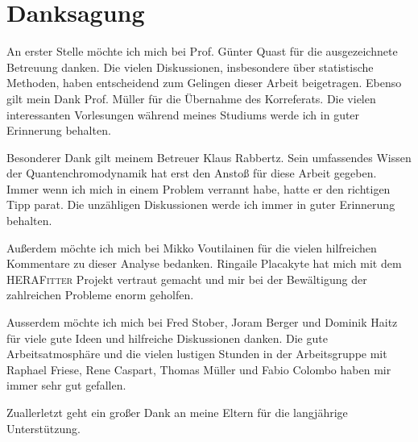 \chapter*{Danksagung}

An erster Stelle möchte ich mich bei Prof. Günter Quast für die ausgezeichnete
Betreuung danken. Die vielen Diskussionen, insbesondere über statistische
Methoden, haben entscheidend zum Gelingen dieser Arbeit beigetragen. Ebenso gilt
mein Dank Prof. Müller für die Übernahme des Korreferats. Die vielen
interessanten Vorlesungen während meines Studiums werde ich in guter Erinnerung
behalten.

Besonderer Dank gilt meinem Betreuer Klaus Rabbertz. Sein umfassendes Wissen der
Quantenchromodynamik hat erst den Anstoß für diese Arbeit gegeben. Immer wenn ich mich
in einem Problem verrannt habe, hatte er den richtigen Tipp parat. Die unzähligen Diskussionen werde ich
immer in guter Erinnerung behalten. 

Außerdem möchte ich mich bei Mikko Voutilainen für die vielen hilfreichen
Kommentare zu dieser Analyse bedanken. Ringaile Placakyte hat mich mit dem \textsc{HERAFitter} Projekt vertraut gemacht und
mir bei der Bewältigung der zahlreichen Probleme enorm geholfen. 

Ausserdem möchte ich mich bei Fred Stober, Joram Berger und Dominik Haitz für
viele gute Ideen und hilfreiche Diskussionen danken. Die gute Arbeitsatmosphäre
und die vielen lustigen Stunden in der Arbeitsgruppe mit Raphael Friese, Rene Caspart,
Thomas Müller und Fabio Colombo haben mir immer sehr gut gefallen.

Zuallerletzt geht ein großer Dank an meine Eltern für die langjährige Unterstützung.

\cleardoublepage %
